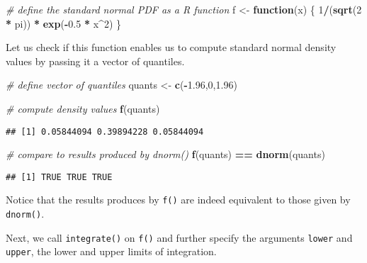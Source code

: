 \documentclass[]{book}
\newenvironment{Shaded}{\begin{snugshade}}{\end{snugshade}}
\newcommand{\KeywordTok}[1]{\textcolor[rgb]{0.13,0.29,0.53}{\textbf{#1}}}
\newcommand{\DecValTok}[1]{\textcolor[rgb]{0.00,0.00,0.81}{#1}}
\newcommand{\FloatTok}[1]{\textcolor[rgb]{0.00,0.00,0.81}{#1}}
\newcommand{\StringTok}[1]{\textcolor[rgb]{0.31,0.60,0.02}{#1}}
\newcommand{\CommentTok}[1]{\textcolor[rgb]{0.56,0.35,0.01}{\textit{#1}}}
\newcommand{\ControlFlowTok}[1]{\textcolor[rgb]{0.13,0.29,0.53}{\textbf{#1}}}
\newcommand{\OperatorTok}[1]{\textcolor[rgb]{0.81,0.36,0.00}{\textbf{#1}}}
\newcommand{\NormalTok}[1]{#1}
\theoremstyle{definition}
\theoremstyle{definition}
\theoremstyle{definition}
\theoremstyle{remark}
\begin{document}
\begin{Shaded}
\begin{Highlighting}[]
\CommentTok{# define the standard normal PDF as a R function}
\NormalTok{f <-}\StringTok{ }\ControlFlowTok{function}\NormalTok{(x) \{}
  \DecValTok{1}\OperatorTok{/}\NormalTok{(}\KeywordTok{sqrt}\NormalTok{(}\DecValTok{2} \OperatorTok{*}\StringTok{ }\NormalTok{pi)) }\OperatorTok{*}\StringTok{ }\KeywordTok{exp}\NormalTok{(}\OperatorTok{-}\FloatTok{0.5} \OperatorTok{*}\StringTok{ }\NormalTok{x}\OperatorTok{^}\DecValTok{2}\NormalTok{)}
\NormalTok{\}}
\end{Highlighting}
\end{Shaded}

Let us check if this function enables us to compute standard normal
density values by passing it a vector of quantiles.

\begin{Shaded}
\begin{Highlighting}[]
\CommentTok{# define vector of quantiles}
\NormalTok{quants <-}\StringTok{ }\KeywordTok{c}\NormalTok{(}\OperatorTok{-}\FloatTok{1.96}\NormalTok{,}\DecValTok{0}\NormalTok{,}\FloatTok{1.96}\NormalTok{)}

\CommentTok{# compute density values}
\KeywordTok{f}\NormalTok{(quants)}
\end{Highlighting}
\end{Shaded}

\begin{verbatim}
## [1] 0.05844094 0.39894228 0.05844094
\end{verbatim}

\begin{Shaded}
\begin{Highlighting}[]
\CommentTok{# compare to results produced by dnorm()}
\KeywordTok{f}\NormalTok{(quants) }\OperatorTok{==}\StringTok{ }\KeywordTok{dnorm}\NormalTok{(quants)}
\end{Highlighting}
\end{Shaded}

\begin{verbatim}
## [1] TRUE TRUE TRUE
\end{verbatim}

Notice that the results produces by \texttt{f()} are indeed equivalent
to those given by \texttt{dnorm()}.

Next, we call \texttt{integrate()} on \texttt{f()} and further specify
the arguments \texttt{lower} and \texttt{upper}, the lower and upper
limits of integration.
\end{document}
